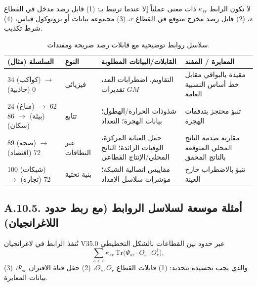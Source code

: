 \documentclass[13pt,a4paper]{article}
\begin{document}
	لا تكون الرابط $\kappa_{sr}$ ذات معنى عملياً إلا عندما ترتبط بـ:
	(1) قابل رصد مدخل في القطاع $s$،
	(2) قابل رصد مخرج متوقع في القطاع $r$،
	(3) مجموعة بيانات أو بروتوكول قياس،
	(4) شرط تكذيب.
	
	\begin{table}[htbp]
		\centering
		\small
		\begin{tabular}{p{}p{}p{}p{}}
			\toprule
			\textbf{السلسلة (مثال)} & \textbf{النوع} & \textbf{القابلات/البيانات المطلوبة} & \textbf{المعايرة / المفند} \\
			\midrule
			34 (كواكب) $\to$ 0 (جاذبية) & فيزيائي & التقاويم، اضطرابات المد، تقديرات $GM$ & مقيدة بالبواقي مقابل خط أساس النسبية العامة \\
			\midrule
			24 (مناخ) $\to$ 62 (بيئة) $\to$ 86 (سكان) & تتابع & شذوذات الحرارة/الهطول؛ بيانات الهجرة؛ التعداد & تنبؤ محتجز بتدفقات الهجرة \\
			\midrule
			89 (صحة) $\to$ 72 (اقتصاد) & عبر النطاقات & حمل العناية المركزة، الوفيات الزائدة؛ الناتج المحلي/الإنتاج القطاعي & مقارنة صدمة الناتج المحلي المتوقعة بالناتج المحقق \\
			\midrule
			100 (شبكات) $\to$ 72 (تجارة) & بنية تحتية & مقاييس اتصالية الشبكة؛ مؤشرات سلاسل الإمداد & تنبؤ بالاضطراب خارج العينة \\
			\bottomrule
		\end{tabular}
		\caption{سلاسل روابط توضيحية مع قابلات رصد صريحة ومفندات.}
		\label{tab:link-chains-auditable}
	\end{table}
	
	\subsection*{A.10.5. أمثلة موسعة لسلاسل الروابط (مع ربط حدود اللاغرانجيان)}
	
	تُنفذ الرابط في لاغرانجيان V35.0 عبر حدود بين القطاعات بالشكل التخطيطي
	$$
	\sum_{s<r}\kappa_{sr}\,\mathrm{Tr}\!\big(\Psi_{sr}\cdot O_s\cdot O_r^\dagger\big),
	$$
	والذي يجب تجسيده بتحديد: (1) قابلات القطاع $O_s,O_r$، (2) حقل قناة الاقتران $\Psi_{sr}$، (3) بيانات المعايرة.
	
\end{document}
